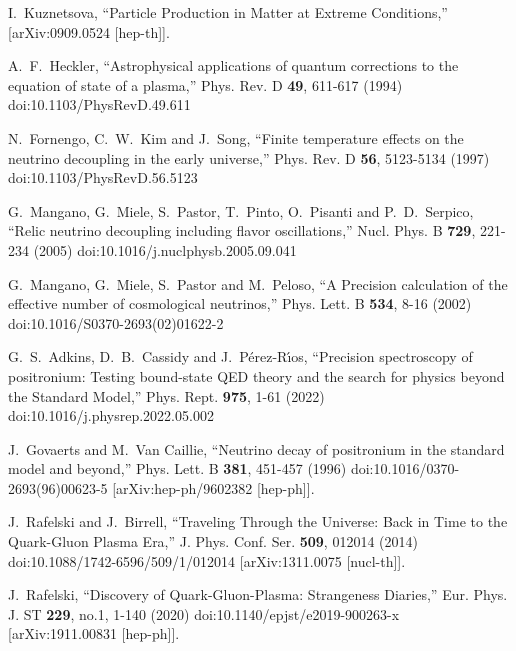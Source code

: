 \begin{thebibliography}{99}
I.~Kuznetsova,
``Particle Production in Matter at Extreme Conditions,''
[arXiv:0909.0524 [hep-th]].

A.~F.~Heckler,
``Astrophysical applications of quantum corrections to the equation of state of a plasma,''
Phys. Rev. D \textbf{49}, 611-617 (1994)
doi:10.1103/PhysRevD.49.611

N.~Fornengo, C.~W.~Kim and J.~Song,
``Finite temperature effects on the neutrino decoupling in the early universe,''
Phys. Rev. D \textbf{56}, 5123-5134 (1997)
doi:10.1103/PhysRevD.56.5123

G.~Mangano, G.~Miele, S.~Pastor, T.~Pinto, O.~Pisanti and P.~D.~Serpico,
``Relic neutrino decoupling including flavor oscillations,''
Nucl. Phys. B \textbf{729}, 221-234 (2005)
doi:10.1016/j.nuclphysb.2005.09.041

G.~Mangano, G.~Miele, S.~Pastor and M.~Peloso,
``A Precision calculation of the effective number of cosmological neutrinos,''
Phys. Lett. B \textbf{534}, 8-16 (2002)
doi:10.1016/S0370-2693(02)01622-2

G.~S.~Adkins, D.~B.~Cassidy and J.~P\'erez-R\'\i{}os,
``Precision spectroscopy of positronium: Testing bound-state QED theory and the search for physics beyond the Standard Model,''
Phys. Rept. \textbf{975}, 1-61 (2022)
doi:10.1016/j.physrep.2022.05.002

J.~Govaerts and M.~Van Caillie,
``Neutrino decay of positronium in the standard model and beyond,''
Phys. Lett. B \textbf{381}, 451-457 (1996)
doi:10.1016/0370-2693(96)00623-5
[arXiv:hep-ph/9602382 [hep-ph]].

J.~Rafelski and J.~Birrell,
``Traveling Through the Universe: Back in Time to the Quark-Gluon Plasma Era,''
J. Phys. Conf. Ser. \textbf{509}, 012014 (2014)
doi:10.1088/1742-6596/509/1/012014
[arXiv:1311.0075 [nucl-th]].

J.~Rafelski,
``Discovery of Quark-Gluon-Plasma: Strangeness Diaries,''
Eur. Phys. J. ST \textbf{229}, no.1, 1-140 (2020)
doi:10.1140/epjst/e2019-900263-x
[arXiv:1911.00831 [hep-ph]].


\end{thebibliography}
